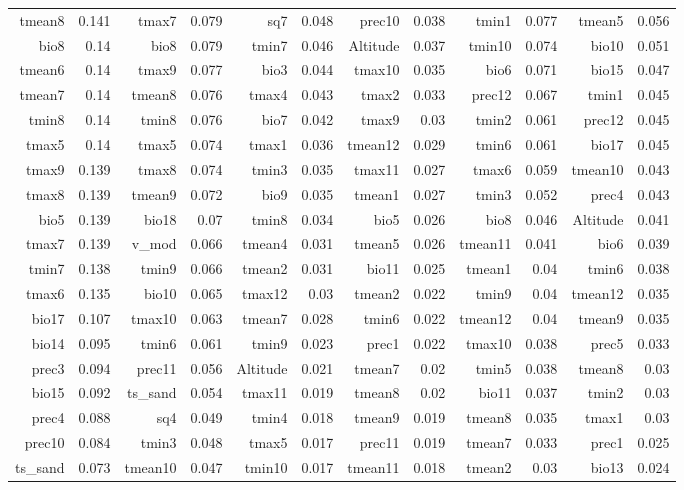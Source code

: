 \documentclass[12pt]{article}
\begin{document}
\begin{table}[htbp]
\begin{tabular}{rrrrrrrrrrrr}
    tmean8 & 0.141 & tmax7 & 0.079 & sq7   & 0.048 & prec10 & 0.038 & tmin1 & 0.077 & tmean5 & 0.056 \\
    bio8  & 0.14  & bio8  & 0.079 & tmin7 & 0.046 & Altitude & 0.037 & tmin10 & 0.074 & bio10 & 0.051 \\
    tmean6 & 0.14  & tmax9 & 0.077 & bio3  & 0.044 & tmax10 & 0.035 & bio6  & 0.071 & bio15 & 0.047 \\
    tmean7 & 0.14  & tmean8 & 0.076 & tmax4 & 0.043 & tmax2 & 0.033 & prec12 & 0.067 & tmin1 & 0.045 \\
    tmin8 & 0.14  & tmin8 & 0.076 & bio7  & 0.042 & tmax9 & 0.03  & tmin2 & 0.061 & prec12 & 0.045 \\
    tmax5 & 0.14  & tmax5 & 0.074 & tmax1 & 0.036 & tmean12 & 0.029 & tmin6 & 0.061 & bio17 & 0.045 \\
    tmax9 & 0.139 & tmax8 & 0.074 & tmin3 & 0.035 & tmax11 & 0.027 & tmax6 & 0.059 & tmean10 & 0.043 \\
    tmax8 & 0.139 & tmean9 & 0.072 & bio9  & 0.035 & tmean1 & 0.027 & tmin3 & 0.052 & prec4 & 0.043 \\
    bio5  & 0.139 & bio18 & 0.07  & tmin8 & 0.034 & bio5  & 0.026 & bio8  & 0.046 & Altitude & 0.041 \\
    tmax7 & 0.139 & v\_mod & 0.066 & tmean4 & 0.031 & tmean5 & 0.026 & tmean11 & 0.041 & bio6  & 0.039 \\
    tmin7 & 0.138 & tmin9 & 0.066 & tmean2 & 0.031 & bio11 & 0.025 & tmean1 & 0.04  & tmin6 & 0.038 \\
    tmax6 & 0.135 & bio10 & 0.065 & tmax12 & 0.03  & tmean2 & 0.022 & tmin9 & 0.04  & tmean12 & 0.035 \\
    bio17 & 0.107 & tmax10 & 0.063 & tmean7 & 0.028 & tmin6 & 0.022 & tmean12 & 0.04  & tmean9 & 0.035 \\
    bio14 & 0.095 & tmin6 & 0.061 & tmin9 & 0.023 & prec1 & 0.022 & tmax10 & 0.038 & prec5 & 0.033 \\
    prec3 & 0.094 & prec11 & 0.056 & Altitude & 0.021 & tmean7 & 0.02  & tmin5 & 0.038 & tmean8 & 0.03 \\
    bio15 & 0.092 & ts\_sand & 0.054 & tmax11 & 0.019 & tmean8 & 0.02  & bio11 & 0.037 & tmin2 & 0.03 \\
    prec4 & 0.088 & sq4   & 0.049 & tmin4 & 0.018 & tmean9 & 0.019 & tmean8 & 0.035 & tmax1 & 0.03 \\
    prec10 & 0.084 & tmin3 & 0.048 & tmax5 & 0.017 & prec11 & 0.019 & tmean7 & 0.033 & prec1 & 0.025 \\
    ts\_sand & 0.073 & tmean10 & 0.047 & tmin10 & 0.017 & tmean11 & 0.018 & tmean2 & 0.03  & bio13 & 0.024 \\

\end{tabular}
\end{table}
\end{document}
